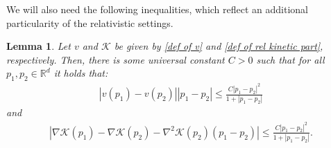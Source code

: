 \documentclass[11pt,reqno]{amsart}
\newtheorem{lem}[thm]{Lemma}
\numberwithin{equation}{section}
\begin{document}
We will also need the following inequalities, which reflect an additional particularity of the relativistic settings. 
\begin{lem}\label{elementary ine lemma}
Let $v$ and $\mathscr{K}$ be given by \eqref{def of v} and \eqref{def of rel kinetic part}, respectively. Then, there is some universal constant $C>0$ such that for all $p_{1},p_{2}\in \mathbb{R}^{d}$ it holds that: 
\begin{align}
\left\vert v(p_{1})-v(p_{2})\right\vert \left\vert p_{1}-p_{2}\right\vert\leq \frac{C\left\vert p_{1}-p_{2}\right\vert^{2}}{1+\left\vert p_{1}-p_{2}\right\vert} \label{first preliminary ine}    
\end{align}
and 
\begin{align}
\left\vert \nabla \mathscr{K}(p_{1})-\nabla \mathscr{K}(p_{2})-\nabla^{2}\mathscr{K}(p_{2})(p_{1}-p_{2})\right\vert \leq \frac{C\left\vert p_{1}-p_{2}\right\vert^{2}}{1+\left\vert p_{1}-p_{2}\right\vert}. \label{second preliminary ine}     
\end{align}
\end{lem}
\end{document}

